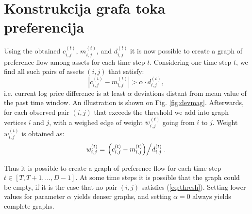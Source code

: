 \documentclass[lmodern, utf8, diplomski, numeric]{fer}
\begin{document}
  \section{Konstrukcija grafa toka preferencija}
  \label{sub:creating-graph}
  Using the obtained $c_{i,j}^{(t)}$, $m_{i,j}^{(t)}$, and $d_{i,j}^{(t)}$ it is now possible to create a graph of preference flow among assets for each time step $t$.
  Considering one time step $t$, we find all such pairs of assets $(i,j)$ that satisfy:
  \begin{equation}
  \label{eq:thresh}
  \left| c_{i,j}^{(t)} - m_{i,j}^{(t)} \right| > \alpha \cdot d_{i,j}^{(t)},
  \end{equation}
  i.e. current log price difference is at least $\alpha$ deviations distant from mean value of the past time window.
  An illustration is shown on Fig. \ref{fig:devmag}.
  Afterwards, for each observed pair $(i,j)$ that exceeds the threshold we add into graph vertices $i$ and $j$, with a weighed edge of weight $w_{i,j}^{(t)}$ going from $i$ to $j$.
  Weight $w_{i,j}^{(t)}$ is obtained as:
  \begin{equation}
  \label{eq:weight}
  w_{i,j}^{(t)} = \left. \left(c_{i,j}^{(t)} - m_{i,j}^{(t)}\right) \middle/ d_{i,j}^{(t)} \right..
  \end{equation}
  
  Thus it is possible to create a graph of preference flow for each time step $t \in \left[T, T + 1, \ldots, D-1\right]$.
  At some time steps it is possible that the graph could be empty, if it is the case that no pair $(i,j)$ satisfies (\ref{eq:thresh}).
  Setting lower values for parameter $\alpha$ yields denser graphs, and setting $\alpha = 0$ always yields complete graphs.
  
\end{document}
